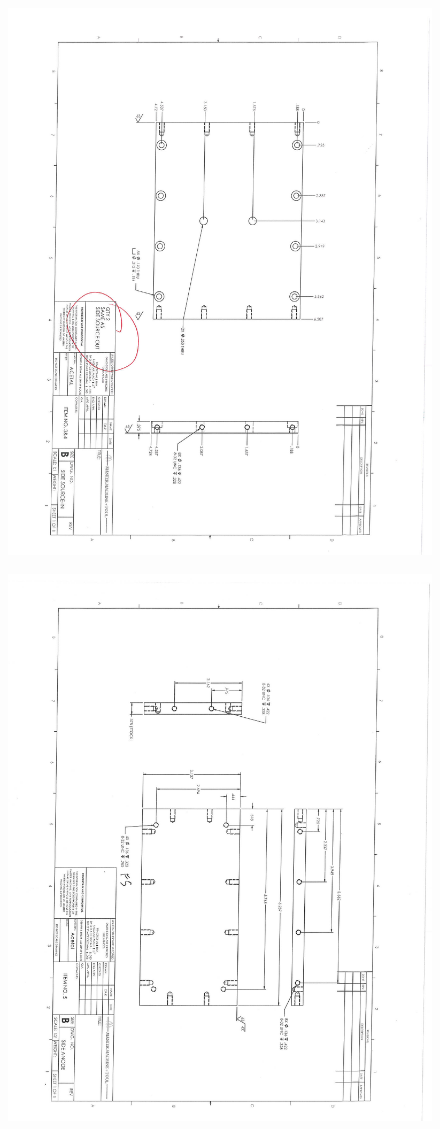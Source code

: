 \begin{figure}[h!]
	\centering
	\includegraphics[width=0.9\linewidth]{figures/dms/DMS_drawings_04.pdf}
\end{figure}

\begin{figure}[h!]
	\centering
	\includegraphics[width=0.9\linewidth]{figures/dms/DMS_drawings_05.pdf}
\end{figure}

